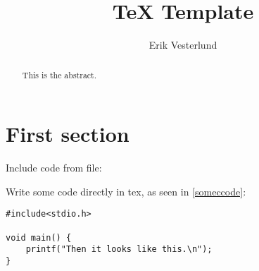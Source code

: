 \documentclass{article}
\title{TeX Template}
\author{Erik Vesterlund} %
\begin{document}
\maketitle

\newpage

\tableofcontents

\newpage

\begin{abstract}
This is the abstract.
\end{abstract}

\newpage

\section{First section}

Include code from file:
\newline


Write some code directly in tex, as seen in \ref{someccode}:
\newline
\begin{lstlisting}[caption={This is a caption}, label=someccode]
#include<stdio.h>

void main() {
    printf("Then it looks like this.\n");
}
\end{lstlisting}
\end{document}
